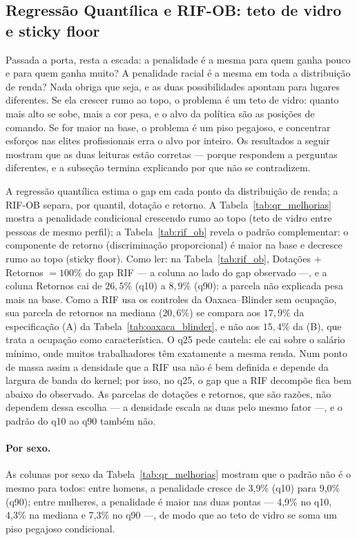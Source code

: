 \documentclass[11pt, a4paper, oneside]{article}
\begin{document}
\subsection*{Regressão Quantílica e RIF-OB: teto de vidro e {sticky floor}}
Passada a porta, resta a escada: a penalidade é a mesma para quem ganha pouco e para quem ganha muito? \label{subsec:qr_rif}
A penalidade racial é a mesma em toda a distribuição de renda? Nada obriga que seja,
e as duas possibilidades apontam para lugares diferentes. Se ela crescer rumo ao topo, o
problema é um teto de vidro: quanto mais alto se sobe, mais a cor pesa, e o alvo da
política são as posições de comando. Se for maior na base, o problema é um piso
pegajoso, e concentrar esforços nas elites profissionais erra o alvo por inteiro. Os
resultados a seguir mostram que as duas leituras estão corretas --- porque respondem a
perguntas diferentes, e a subseção termina explicando por que não se contradizem.

A regressão quantílica estima o gap em cada ponto da distribuição de renda; a
RIF-OB separa, por quantil, dotação e retorno. A Tabela~\ref{tab:qr_melhorias}
mostra a penalidade {condicional} crescendo rumo ao topo (teto de vidro entre
pessoas de mesmo perfil); a
Tabela~\ref{tab:rif_ob} revela o padrão complementar: o componente de retorno
(discriminação proporcional) é maior na base e {decresce} rumo ao topo
({sticky floor}). {Como ler:} na Tabela~\ref{tab:rif_ob}, Dotações $+$
Retornos $=100\%$ do gap RIF --- a coluna ao lado do gap observado ---,
e a coluna Retornos cai de $26{,}5\%$ (q10) a $8{,}9\%$ (q90):
a parcela não explicada pesa mais na base. Como a RIF usa os controles da
Oaxaca--Blinder {sem} ocupação, sua parcela de retornos na mediana
($20{,}6\%$) se compara aos $17{,}9\%$ da especificação (A)
da Tabela~\ref{tab:oaxaca_blinder}, e não aos $15{,}4\%$ da (B), que trata a
ocupação como característica. O q25 pede cautela: ele cai sobre o salário mínimo,
onde muitos trabalhadores têm exatamente a mesma renda. Num ponto de massa assim a
densidade que a RIF usa não é bem definida e depende da largura de banda do
{kernel}; por isso, no q25, o gap que a RIF decompõe fica bem abaixo do
observado. As parcelas de dotações e retornos, que são razões, não dependem dessa
escolha --- a densidade escala as duas pelo mesmo fator ---, e o padrão do q10 ao q90
também não.

\paragraph{Por sexo.} As colunas por sexo da Tabela~\ref{tab:qr_melhorias} mostram que o padrão não é o mesmo para todos: entre homens, a penalidade cresce de 3,9\% (q10) para 9,0\% (q90); entre mulheres, a penalidade é maior nas duas pontas --- 4,9\% no q10, 4,3\% na mediana e 7,3\% no q90 ---, de modo que ao teto de vidro se soma um piso pegajoso {condicional}.
\end{document}
